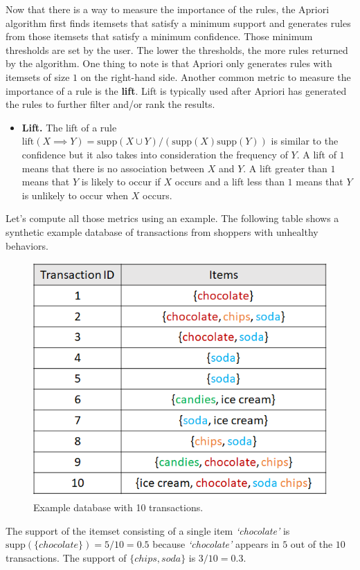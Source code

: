 \documentclass[
  11pt,
]{krantz}
\providecommand{\tightlist}{%
  \setlength{\itemsep}{0pt}\setlength{\parskip}{0pt}}
\begin{document}
Now that there is a way to measure the importance of the rules, the Apriori algorithm first finds itemsets that satisfy a minimum support and generates rules from those itemsets that satisfy a minimum confidence. Those minimum thresholds are set by the user. The lower the thresholds, the more rules returned by the algorithm. One thing to note is that Apriori only generates rules with itemsets of size \(1\) on the right-hand side. Another common metric to measure the importance of a rule is the \textbf{lift}. Lift is typically used after Apriori has generated the rules to further filter and/or rank the results.

\begin{itemize}
\tightlist
\item
  \textbf{Lift.} The lift of a rule \(\text{lift}(X \implies Y) = \text{supp}(X \cup Y) / (\text{supp}(X)\text{supp}(Y))\) is similar to the confidence but it also takes into consideration the frequency of \(Y\). A lift of \(1\) means that there is no association between \(X\) and \(Y\). A lift greater than \(1\) means that \(Y\) is likely to occur if \(X\) occurs and a lift less than \(1\) means that \(Y\) is unlikely to occur when \(X\) occurs.
\end{itemize}

Let's compute all those metrics using an example. The following table shows a synthetic example database of transactions from shoppers with unhealthy behaviors.

\begin{figure}

{\centering \includegraphics[width=0.5\linewidth]{images/transactions_tab} 

}

\caption{Example database with 10 transactions.}\label{fig:transactionsTab}
\end{figure}

The support of the itemset consisting of a single item \emph{`chocolate'} is \(\text{supp}(\{chocolate\}) = 5/10 = 0.5\) because \emph{`chocolate'} appears in \(5\) out of the \(10\) transactions. The support of \(\{chips, soda\}\) is \(3/10 = 0.3\).
\end{document}
